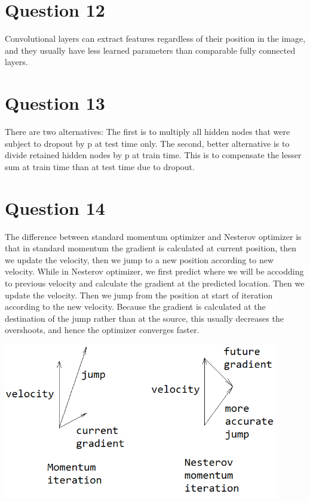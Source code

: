 \documentclass[10pt]{article}
\begin{document}
\section{Question 12}
Convolutional layers can extract features regardless of their position in the image, and they usually have less learned parameters than comparable fully connected layers.

\section{Question 13}
There are two alternatives: The first is to multiply all hidden nodes that were subject to dropout by p at test time only. The second, better alternative is to divide retained hidden nodes by p at train time. This is to compensate the lesser sum at train time than at test time due to dropout. 

\section{Question 14}
The difference between standard momentum optimizer and Nesterov optimizer is that in standard momentum the gradient is calculated at current position, then we update the velocity, then we jump to a new position according to new velocity. While in Nesterov optimizer, we first predict where we will be accodding to previous velocity and calculate the gradient at the predicted location. Then we update the velocity. Then we jump from the position at start of iteration according to the new velocity. Because the gradient is calculated at the destination of the jump rather than at the source, this usually decreases the overshoots, and hence the optimizer converges faster.

\begin{center}
\includegraphics[width=0.9\textwidth]{20220504 Q14 Nesterov.PNG}
\end{center}
\end{document}
